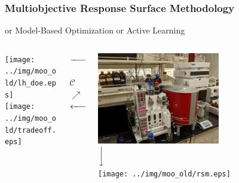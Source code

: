 \documentclass[aspectratio=169]{beamer}
\newcommand{\xdownarrow}[1]{%
  {\left\downarrow\vbox to #1{}\right.\kern-\nulldelimiterspace}
}
\begin{document}
\begin{frame}\frametitle{Multiobjective Response Surface Methodology}
{or Model-Based Optimization or Active Learning}
\begin{columns}
\begin{column}{0.4\textwidth}
\begin{center}
\texttt{[image: ../img/moo\_old/lh\_doe.eps]}\\%
\medskip
\vskip 0.5cm
\medskip
\texttt{[image: ../img/moo\_old/tradeoff.eps]}%
\end{center}
\end{column}
\begin{column}{0.2\textwidth}
\begin{center}
$\xrightarrow{\hspace*{1.5cm}}$%
\\
\vskip 1.2cm
$\qquad\qquad\nearrow$\\
{\Huge $\mathcal{C}$}\\
$\nearrow\qquad\qquad$%
\\
\vskip 1cm
$\xleftarrow{\hspace*{1.5cm}}$%
\end{center}
\end{column}
\begin{column}{0.4\textwidth}
\begin{center}
\includegraphics[width=0.58\textwidth]{../img/probs/cfr-nmr-setup.jpg}%
\\
\medskip
$\xdownarrow{0.5cm}$\\
\medskip
\texttt{[image: ../img/moo\_old/rsm.eps]}%
\end{center}
\end{column}
\end{columns}
\end{frame}
\end{document}
